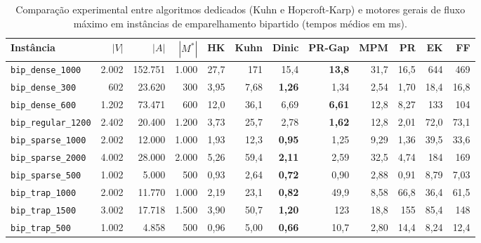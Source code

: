 \begin{table}[!ht]
\centering
\small
\setlength{\tabcolsep}{3.5pt}
\begin{tabular}{lrrrrrrrrrrr}
\toprule
\textbf{Instância} & $|V|$ & $|A|$ & $|M^*|$ & \textbf{HK} & \textbf{Kuhn} & \textbf{Dinic} & \textbf{PR-Gap} & \textbf{MPM} & \textbf{PR} & \textbf{EK} & \textbf{FF} \\
\midrule
\texttt{bip\_dense\_1000} & 2.002 & 152.751 & 1.000 & 27,7 & 171 & 15,4 & \textbf{13,8} & 31,7 & 16,5 & 644 & 469 \\
\texttt{bip\_dense\_300} & 602 & 23.620 & 300 & 3,95 & 7,68 & \textbf{1,26} & 1,34 & 2,54 & 1,70 & 18,4 & 16,8 \\
\texttt{bip\_dense\_600} & 1.202 & 73.471 & 600 & 12,0 & 36,1 & 6,69 & \textbf{6,61} & 12,8 & 8,27 & 133 & 104 \\
\texttt{bip\_regular\_1200} & 2.402 & 20.400 & 1.200 & 3,73 & 25,7 & 2,78 & \textbf{1,62} & 12,8 & 2,01 & 72,0 & 73,1 \\
\texttt{bip\_sparse\_1000} & 2.002 & 12.000 & 1.000 & 1,93 & 12,3 & \textbf{0,95} & 1,25 & 9,29 & 1,36 & 39,5 & 33,6 \\
\texttt{bip\_sparse\_2000} & 4.002 & 28.000 & 2.000 & 5,26 & 59,4 & \textbf{2,11} & 2,59 & 32,5 & 4,74 & 184 & 169 \\
\texttt{bip\_sparse\_500} & 1.002 & 5.000 & 500 & 0,93 & 2,64 & \textbf{0,72} & 0,90 & 2,88 & 0,91 & 8,79 & 7,03 \\
\texttt{bip\_trap\_1000} & 2.002 & 11.770 & 1.000 & 2,19 & 23,1 & \textbf{0,82} & 49,9 & 8,58 & 66,8 & 36,4 & 61,5 \\
\texttt{bip\_trap\_1500} & 3.002 & 17.718 & 1.500 & 3,90 & 50,7 & \textbf{1,20} & 123 & 18,8 & 155 & 85,4 & 148 \\
\texttt{bip\_trap\_500} & 1.002 & 4.858 & 500 & 0,96 & 5,00 & \textbf{0,66} & 10,7 & 2,80 & 14,4 & 8,24 & 12,4 \\
\bottomrule
\end{tabular}
\caption{Comparação experimental entre algoritmos dedicados (Kuhn e Hopcroft-Karp) e motores gerais de fluxo máximo em instâncias de emparelhamento bipartido (tempos médios em ms).}
\label{tab:benchmarks_bipartite_matching}
\end{table}
